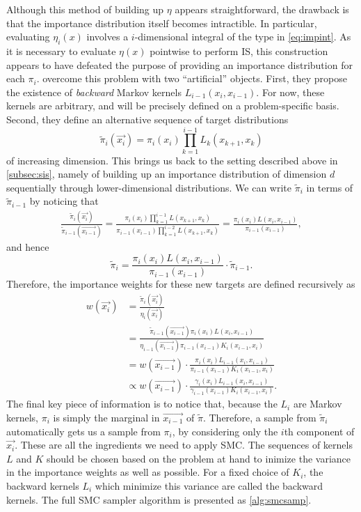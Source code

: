 Although this method of building up $\eta$ appears straightforward, the
drawback is that the importance distribution itself becomes intractible. In
particular, evaluating $\eta_i(x)$ involves a $i$-dimensional integral of the
type in \cref{eq:impint}. As it is necessary to evaluate $\eta(x)$ pointwise to
perform \gls{IS}, this construction appears to have defeated the purpose of
providing an importance distribution for each $\pi_i$.
\textcite{del2006sequential} overcome this problem with two ``artificial''
objects. First, they propose the existence of \textit{backward} Markov kernels
$L_{i-1}(x_i, x_{i-1})$. For now, these kernels are arbitrary, and will be
precisely defined on a problem-specific basis. Second, they define an
alternative sequence of target distributions
\[
  \tilde{\pi}_i(\vec{x_i}) = \pi_i(x_i) \prod_{k=1}^{i-1} L_k(x_{k+1}, x_k)
\]
of increasing dimension. This brings us back to the setting described above in
\cref{subsec:sis}, namely of building up an importance distribution of
dimension $d$ sequentially through lower-dimensional distributions. We can
write $\tilde{\pi}_i$ in terms of $\tilde{\pi}_{i-1}$ by noticing that
\begin{align*}
  \frac{\tilde{\pi}_i(\vec{x_i})}{\tilde{\pi}_{i-1}(\vec{x_{i-1}})} 
  = \frac{\pi_i(x_i) \prod_{k=1}^{i-1} L(x_{k+1}, x_k)}
  {\pi_{i-1}(x_{i-1}) \prod_{k=1}^{i-2} L(x_{k+1}, x_k)}
  = \frac{\pi_i(x_i) L(x_i, x_{i-1})}{\pi_{i-1}(x_{i-1})},
\end{align*}
and hence
\[
  \tilde{\pi}_i = \frac{\pi_i(x_i) L(x_i, x_{i-1})}{\pi_{i-1}(x_{i-1})} \cdot \tilde{\pi}_{i-1}.
\]
Therefore, the importance weights for these new targets are defined recursively as
\begin{align}
  w(\vec{x_i}) 
    &= \frac{\tilde{\pi}_i(\vec{x_i})}{\eta_i(\vec{x_i})} \\
    &= \frac{\tilde{\pi}_{i-1}(\vec{x_{i-1}}) \pi_i(x_i) L(x_i, x_{i-1})}
           {\eta_{i-1}(\vec{x_{i-1}}) \pi_{i-1}(x_{i-1}) K_i(x_{i-1}, x_i)} \\
    &= w(\vec{x_{i-1}}) \cdot
      \frac{\pi_i(x_i) L_{i-1}(x_i, x_{i-1})}
           {\pi_{i-1}(x_{i-1}) K_i(x_{i-1}, x_i)} \\
    &\propto w(\vec{x_{i-1}}) \cdot
      \frac{\gamma_i(x_i) L_{i-1}(x_i, x_{i-1})}
           {\gamma_{i-1}(x_{i-1}) K_i(x_{i-1}, x_i)}.
    \label{eq:smcwt}
\end{align}
The final key piece of information is to notice that, because the $L_i$ are
Markov kernels, $\pi_i$ is simply the marginal in $\vec{x_{i-1}}$ of
$\tilde{\pi}$. Therefore, a sample from $\tilde{\pi}_i$ automatically gets us a
sample from $\pi_i$, by considering only the $i$th component of $\vec{x_i}$.
These are all the ingredients we need to apply \gls{SMC}. The sequences of
kernels $L$ and $K$ should be chosen based on the problem at hand to inimize
the variance in the importance weights as well as possible. For a fixed choice
of $K_i$, the backward kernels $L_i$ which minimize this variance are called
the  backward kernels. The full \gls{SMC} sampler algorithm is
presented as \cref{alg:smcsamp}.

